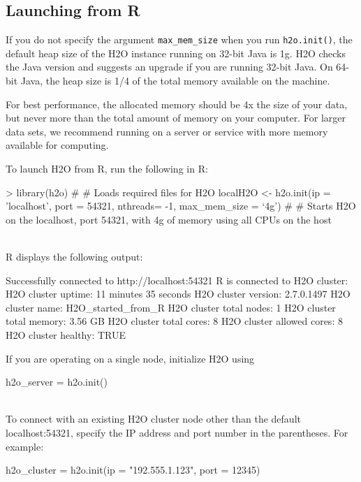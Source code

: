 \documentclass{article}[11pt]
\begin{document}
\subsection{Launching from R}

If you do not specify the argument {\texttt{max\_mem\_size}} when you run {\texttt{h2o.init()}}, the default heap size of the H2O instance running on 32-bit Java is 1g. H2O checks the Java version and suggests an upgrade if you are running 32-bit Java. On 64-bit Java, the heap size is 1/4 of the total memory available on the machine. 

For best performance, the allocated memory should be 4x the size of your data, but never more than the total amount of memory on your computer. For larger data sets, we recommend running on a server or service with more memory available for computing.


To launch H2O from R, run the following in R:
\begin{spverbatim}
> library(h2o) # # Loads required files for H2O
localH2O <- h2o.init(ip = 'localhost', port = 54321, nthreads= -1, max_mem_size = ‘4g') # # Starts H2O on the localhost, port 54321, with 4g of memory using all CPUs on the host  \end{spverbatim} 
\\

R displays the following output: 
\begin{spverbatim}
Successfully connected to http://localhost:54321
       R is connected to H2O cluster:
   H2O cluster uptime:         11 minutes 35 seconds
   H2O cluster version:        2.7.0.1497
   H2O cluster name:           H2O_started_from_R
   H2O cluster total nodes:    1
   H2O cluster total memory:   3.56 GB
   H2O cluster total cores:    8
   H2O cluster allowed cores:  8
   H2O cluster healthy:        TRUE
\end{spverbatim}

If you are operating on a single node, initialize H2O using \begin{spverbatim} h2o_server = h2o.init()\end{spverbatim}\\

To connect with an existing H2O cluster node other than the default localhost:54321, specify the IP address and port number in the parentheses. For example: \begin{spverbatim}h2o_cluster = h2o.init(ip = "192.555.1.123", port = 12345)\end{spverbatim}
\end{document}
